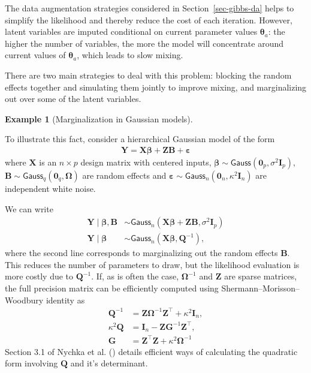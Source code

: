 \documentclass[
  11pt,
  letterpaper,
]{scrbook}
\theoremstyle{plain}
\theoremstyle{definition}
\theoremstyle{definition}
\newtheorem{example}{Example}[chapter]
\theoremstyle{plain}
\theoremstyle{plain}
\theoremstyle{definition}
\theoremstyle{remark}
\begin{document}
The data augmentation strategies considered in
Section~\ref{sec-gibbs-da} helps to simplify the likelihood and thereby
reduce the cost of each iteration. However, latent variables are imputed
conditional on current parameter values \(\boldsymbol{\theta}_a\): the
higher the number of variables, the more the model will concentrate
around current values of \(\boldsymbol{\theta}_a\), which leads to slow
mixing.

There are two main strategies to deal with this problem: blocking the
random effects together and simulating them jointly to improve mixing,
and marginalizing out over some of the latent variables.

\begin{example}[Marginalization in Gaussian
models]\protect\hypertarget{exm-marginalization-Gauss}{}\label{exm-marginalization-Gauss}

To illustrate this fact, consider a hierarchical Gaussian model of the
form \begin{align*}
\boldsymbol{Y} = \mathbf{X}\boldsymbol{\beta} + \mathbf{Z}\boldsymbol{B} + \boldsymbol{\varepsilon}
\end{align*} where \(\mathbf{X}\) is an \(n \times p\) design matrix
with centered inputs,
\(\boldsymbol{\beta} \sim \mathsf{Gauss}(\boldsymbol{0}_p, \sigma^2\mathbf{I}_p),\)
\(\boldsymbol{B}\sim \mathsf{Gauss}_q(\boldsymbol{0}_q, \boldsymbol{\Omega})\)
are random effects and
\(\boldsymbol{\varepsilon} \sim \mathsf{Gauss}_n(\boldsymbol{0}_n, \kappa^2\mathbf{I}_n)\)
are independent white noise.

We can write \begin{align*}
\boldsymbol{Y} \mid \mathbf{\beta}, \boldsymbol{B} &\sim \mathsf{Gauss}_n(\mathbf{X}\boldsymbol{\beta} + \mathbf{Z}\boldsymbol{B},  \sigma^2\mathbf{I}_p)\\
\boldsymbol{Y} \mid \mathbf{\beta} &\sim \mathsf{Gauss}_n(\mathbf{X}\boldsymbol{\beta}, \mathbf{Q}^{-1}),
\end{align*} where the second line corresponds to marginalizing out the
random effects \(\boldsymbol{B}.\) This reduces the number of parameters
to draw, but the likelihood evaluation is more costly due to
\(\mathbf{Q}^{-1}\). If, as is often the case,
\(\boldsymbol{\Omega}^{-1}\) and \(\mathbf{Z}\) are sparse matrices, the
full precision matrix can be efficiently computed using
Shermann--Morisson--Woodbury identity as \begin{align*}
\mathbf{Q}^{-1} &=   \mathbf{Z}\boldsymbol{\Omega}^{-1}\mathbf{Z}^\top + \kappa^2 \mathbf{I}_n,\\
\kappa^2\mathbf{Q} & = \mathbf{I}_n - \mathbf{Z} \boldsymbol{G}^{-1} \mathbf{Z}^\top,\\
\boldsymbol{G} &= \mathbf{Z}^\top\mathbf{Z} + \kappa^2 \boldsymbol{\Omega}^{-1}
\end{align*} Section 3.1 of Nychka et al.
() details efficient ways of calculating
the quadratic form involving \(\mathbf{Q}\) and it's determinant.

\end{example}
\end{document}
